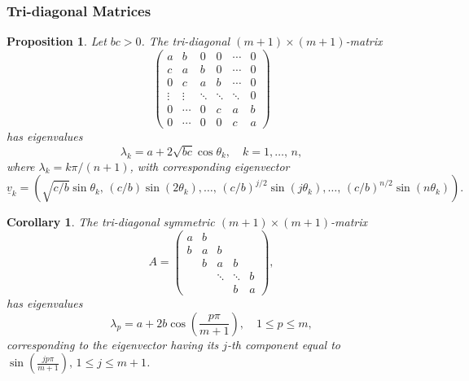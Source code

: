 \documentclass{article}
\newtheorem{corollary}{Corollary}
\newtheorem{proposition}{Proposition}
\begin{document}
\subsubsection{Tri-diagonal Matrices}
\begin{proposition}
    Let $bc>0$. The tri-diagonal $(m+1)\times(m+1)$-matrix
    \begin{equation}
        \begin{pmatrix}
            a & b & 0 & 0 & \cdots & 0 \\
            c & a & b & 0 & \cdots & 0 \\
            0 & c & a & b & \cdots & 0 \\
            \vdots & \vdots & \ddots & \ddots & \ddots & 0 \\
            0 & \cdots & 0 & c & a & b \\
            0 & \cdots & 0 & 0 & c & a 
        \end{pmatrix} \nonumber
    \end{equation}
    has eigenvalues
    \begin{equation}
        \lambda_k = a + 2\sqrt{bc}\cos{\theta_k},\quad k = 1,\ldots,\,n, \nonumber
    \end{equation}
    where $\lambda_k = k\pi/(n+1)$, with corresponding eigenvector
    \begin{equation}
        \underline{v}_k = ( \sqrt{c/b}\sin{\theta_k},\,(c/b)\sin{(2\theta_k)},\ldots,\,(c/b)^{j/2}\sin{(j\theta_k)},\ldots,\,(c/b)^{n/2}\sin{(n\theta_k)} ). \nonumber
    \end{equation}
\end{proposition}
\begin{corollary}
    The tri-diagonal symmetric $(m+1)\times(m+1)$-matrix 
    \begin{equation}
        A =
        \begin{pmatrix}
            a & b & & &  \\
            b & a & b & & \\
            & b & a & b & \\
            & & \ddots & \ddots & b \\
            & & & b & a 
        \end{pmatrix}, \nonumber
    \end{equation}
    has eigenvalues
    \begin{equation}
        \lambda_p = a+2b\cos{\left( \frac{p\pi}{m+1} \right)},\quad 1\leq p\leq m,
    \end{equation}
    corresponding to the eigenvector having its $j$-th component equal to $\sin{\left( \frac{jp\pi}{m+1} \right)},\, 1\leq j\leq m+1$.
\end{corollary}
\end{document}
